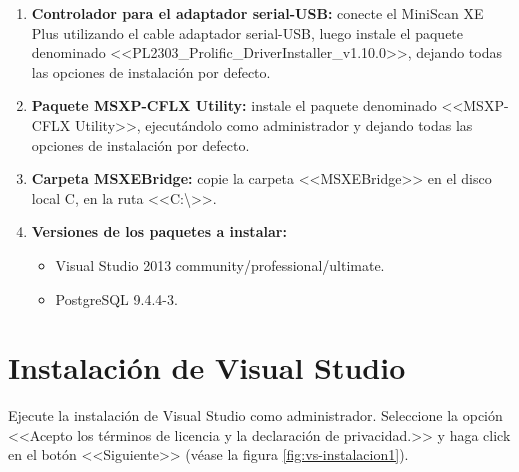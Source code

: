 \begin{enumerate}
	\item \textbf{Controlador para el adaptador serial-USB:} conecte el MiniScan XE Plus utilizando el cable adaptador serial-USB, luego instale el paquete denominado <<PL2303\_Prolific\_DriverInstaller\_v1.10.0>>, dejando todas las opciones de instalaci\'{o}n por defecto.
	
	\item \textbf{Paquete MSXP-CFLX Utility:} instale el paquete denominado <<MSXP-CFLX Utility>>, ejecut\'{a}ndolo como administrador y dejando todas las opciones de instalaci\'{o}n por defecto.
	
	\item \textbf{Carpeta MSXEBridge:} copie la carpeta <<MSXEBridge>> en el disco local C, en la ruta <<C:\textbackslash>>.
	
	\item \textbf{Versiones de los paquetes a instalar:} 
	\begin{itemize}
		\item Visual Studio 2013 community/professional/ultimate.
	
		\item PostgreSQL 9.4.4-3.
	\end{itemize}
\end{enumerate}

\newpage

\section*{Instalaci\'{o}n de Visual Studio}
	
Ejecute la instalaci\'{o}n de Visual Studio como administrador. Seleccione la opci\'{o}n <<Acepto los t\'{e}rminos de licencia y la declaraci\'{o}n de privacidad.>> y haga click en el bot\'{o}n <<Siguiente>> (v\'{e}ase la figura \ref{fig:vs-instalacion1}).

\vfill

